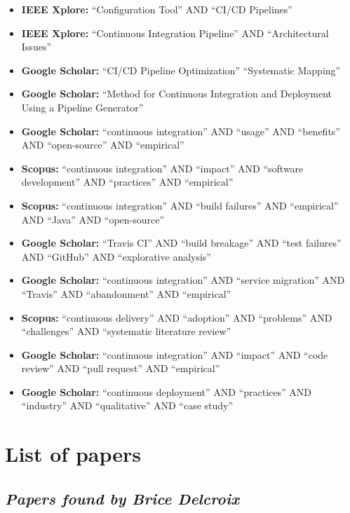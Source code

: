 \documentclass[a4paper,11pt,oneside]{article}
\begin{document}
\begin{itemize}
    \item \textbf{IEEE Xplore:} ``Configuration Tool'' AND ``CI/CD Pipelines''
    \item \textbf{IEEE Xplore:} ``Continuous Integration Pipeline'' AND ``Architectural Issues''
    \item \textbf{Google Scholar:} ``CI/CD Pipeline Optimization'' ``Systematic Mapping''
    \item \textbf{Google Scholar:} ``Method for Continuous Integration and Deployment Using a Pipeline Generator''
    \item \textbf{Google Scholar:} ``continuous integration'' AND ``usage'' AND ``benefits'' AND ``open-source'' AND ``empirical''
    \item \textbf{Scopus:} ``continuous integration'' AND ``impact'' AND ``software development'' AND ``practices'' AND ``empirical''
    \item \textbf{Scopus:} ``continuous integration'' AND ``build failures'' AND ``empirical'' AND ``Java'' AND ``open-source''
    \item \textbf{Google Scholar:} ``Travis CI'' AND ``build breakage'' AND ``test failures'' AND ``GitHub'' AND ``explorative analysis''
    \item \textbf{Google Scholar:} ``continuous integration'' AND ``service migration'' AND ``Travis'' AND ``abandonment'' AND ``empirical''
    \item \textbf{Scopus:} ``continuous delivery'' AND ``adoption'' AND ``problems'' AND ``challenges'' AND ``systematic literature review''
    \item \textbf{Google Scholar:} ``continuous integration'' AND ``impact'' AND ``code review'' AND ``pull request'' AND ``empirical''
    \item \textbf{Google Scholar:} ``continuous deployment'' AND ``practices'' AND ``industry'' AND ``qualitative'' AND ``case study''
\end{itemize}

\section{List of papers}

\subsection*{\textit{Papers found by Brice Delcroix}}
\end{document}
